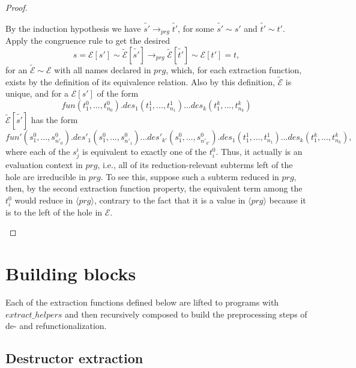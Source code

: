 \begin{proposition}
\begin{proof}
\begin{enumerate}
By the induction hypothesis we have $\widetilde{s'} \longrightarrow_{prg} \widetilde{t'}$, for some $\widetilde{s'} \sim s'$ and $\widetilde{t'} \sim t'$. Apply the congruence rule to get the desired
\begin{equation*}
s = \mathcal{E}[s'] \sim \widetilde{\mathcal{E}}[\widetilde{s'}] \longrightarrow_{prg} \widetilde{\mathcal{E}}[\widetilde{t'}] \sim \mathcal{E}[t'] = t,
\end{equation*}
for an $\widetilde{\mathcal{E}} \sim \mathcal{E}$ with all names declared in $prg$, which, for each extraction function, exists by the definition of its equivalence relation. Also by this definition, $\widetilde{\mathcal{E}}$ is unique, and for a $\mathcal{E}[s']$ of the form
\begin{equation*}
fun(t^0_1, ..., t^0_{n_0}).des_1(t^1_1, ..., t^1_{n_1})...des_k(t^k_1, ..., t^k_{n_k})
\end{equation*}
$\widetilde{\mathcal{E}}[\widetilde{s'}]$ has the form
\begin{equation*}
fun'(s^0_1, ..., s^0_{n'_0}).des'_1(s^0_1, ..., s^0_{n'_1})...des'_{k'}(s^0_1, ..., s^0_{n'_{k'}}).des_1(t^1_1, ..., t^1_{n_1})...des_k(t^k_1, ..., t^k_{n_k}),
\end{equation*}
where each of the $s^i_j$ is equivalent to exactly one of the $t^0_i$. Thus, it actually is an evaluation context in $prg$, i.e., all of its reduction-relevant subterms left of the hole are irreducible in $prg$. To see this, suppose such a subterm reduced in $prg$, then, by the second extraction function property, the equivalent term among the $t^0_i$ would reduce in $\langle prg \rangle$, contrary to the fact that it is a value in $\langle prg \rangle$ because it is to the left of the hole in $\mathcal{E}$.

\end{enumerate}

\end{proof}

\end{proposition}

\section{Building blocks}

Each of the extraction functions defined below are lifted to programs with $extract\_helpers$ and then recursively composed to build the preprocessing steps of de- and refunctionalization.

\subsection{Destructor extraction}

